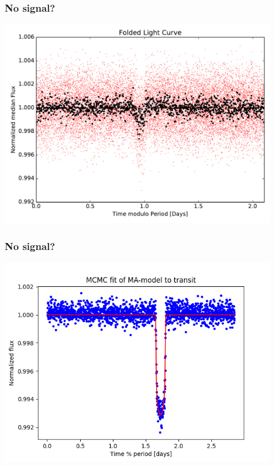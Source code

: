 \documentclass[notes]{beamer}
\begin{document}
\begin{frame}
\frametitle{No signal?}
\centering
\includegraphics[width=0.9\textwidth]{../figures/2019-1-15_16:2:14_Folded_TIC89020549.pdf}
\end{frame}

\begin{frame}
\frametitle{No signal?}
\centering
\includegraphics[width=0.9\textwidth]{../figures/MCMC_fit0.png}
\end{frame}
\end{document}
